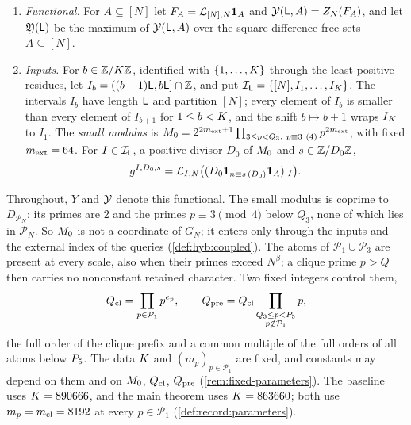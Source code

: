 \begin{definition}
\begin{enumerate}[label=(\alph*)]
 at scale $N$ consists of the clique atoms $\{p\}$, $p\in\mathcal P_1$; the
 blocks of a fixed partition of $\mathcal P_3$ into finite sets (the middle
 blocks of \cref{def:record:exact-blocks} and the upper blocks of
 \cref{def:record:upper-bands}); and the tail atoms $\{p\}$,
 $p\in\mathcal T_N$. For an atom $\Blk$ we write $X_\Blk$ for $X_{\mathcal S}$
 with $\mathcal S$ the set of primes of $\Blk$, and $\mu_\Blk$ for its
 reference law, a probability measure on $X_\Blk^V$ (constructed in Part~V;
 Parts~II and~III use only \cref{hyp:record:reference}). For a set
 $\mathcal S$ of atoms put $\mu_{\mathcal S}=\bigotimes_{\Blk\in\mathcal S}\mu_\Blk$
 and $Z_{\mathcal S}(g)=\Lambda_{\mu_{\mathcal S}}(g)$ for
 $g\colon X_{\mathcal S}\to\R$; and $\mu_N=\mu_{\mathcal A_N}$,
 $Z_N=Z_{\mathcal A_N}$.
\item \emph{Functional.} For $A\subseteq[N]$ let $F_A=\mathcal L_{[N],N}\mathbf 1_A$
 and $\mathcal Y(\mathsf L,A)=Z_N(F_A)$, and let $\mathfrak Y(\mathsf L)$ be the maximum of
 $\mathcal Y(\mathsf L,A)$ over the square-difference-free sets $A\subseteq[N]$.
\item \emph{Inputs.} For $b\in\mathbb Z/K\mathbb Z$, identified with
 $\{1,\dots,K\}$ through the least positive residues, let
 $I_b=((b-1)\mathsf L,b\mathsf L]\cap\mathbb Z$, and put $\mathcal I_\mathsf L=\{[N],I_1,\dots,I_K\}$.
 The intervals $I_b$ have length $\mathsf L$ and partition $[N]$; every element of
 $I_b$ is smaller than every element of $I_{b+1}$ for $1\le b<K$, and the
 shift $b\mapsto b+1$ wraps $I_K$ to $I_1$. The \emph{small modulus} is
 $\Mzero=2^{2m_{\rm ext}+1}\prod_{3\le p<Q_3,\ p\equiv3\ (4)}p^{2m_{\rm ext}}$, with fixed $m_{\rm ext}=64$. For $I\in\mathcal I_\mathsf L$, a
 positive divisor $D_0$ of $M_0$ and $s\in\mathbb Z/D_0\mathbb Z$,
 \[
  g^{I,D_0,s}=\mathcal L_{I,N}\big((D_0\mathbf 1_{n\equiv s\,(D_0)}\mathbf 1_A)|_I\big).
 \]
\end{enumerate}
\end{definition}

Throughout, $Y$ and $\mathcal Y$ denote this functional. The small modulus is coprime
to $D_{\mathcal P_N}$: its primes are $2$ and the primes $p\equiv3\pmod4$ below
$Q_3$, none of which lies in $\mathcal P_N$. So $M_0$ is not a coordinate of
$G_N$; it enters only through the inputs and the external index of the
queries (\cref{def:hyb:coupled}). The atoms of $\mathcal P_1\cup\mathcal P_3$
are present at every scale, also when their primes exceed $N^\beta$; a clique
prime $p>Q$ then carries no nonconstant retained character. Two fixed integers
control them,
\[
 Q_{\rm cl}=\prod_{p\in\mathcal P_1}p^{e_p},\qquad
 Q_{\rm pre}=Q_{\rm cl}\prod_{\substack{Q_3\le p<P_5\\ p\notin\mathcal P_1}}p ,
\]
the full order of the clique prefix and a common multiple of the full orders of
all atoms below $P_5$. The data $K$ and $(m_p)_{p\in\mathcal P_1}$ are
fixed, and constants may depend on them and on $M_0$, $Q_{\rm cl}$,
$Q_{\rm pre}$ (\cref{rem:fixed-parameters}). The baseline uses
$K=890666$, and the main theorem uses $K=863660$;
both use $m_p=m_{\mathrm{cl}}=8192$ at every $p\in\mathcal P_1$
(\cref{def:record:parameters}).

